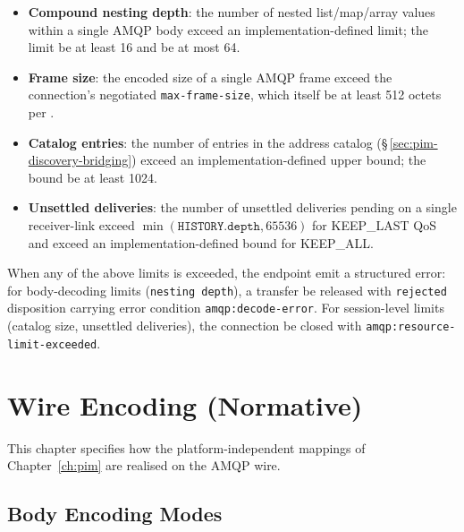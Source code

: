 \documentclass{../styles/zerodds-vendor-spec}
\begin{document}
\begin{itemize}
  \item \textbf{Compound nesting depth}: the number of nested
        list/map/array values within a single AMQP body
         exceed an implementation-defined limit;
        the limit  be at least 16 and 
        be at most 64.
  \item \textbf{Frame size}: the encoded size of a single AMQP
        frame  exceed the connection's negotiated
        \texttt{max-frame-size}, which itself  be at
        least 512 octets per
        .
  \item \textbf{Catalog entries}: the number of entries in
        the address catalog (\S\,\ref{sec:pim-discovery-bridging})
         exceed an implementation-defined upper
        bound; the bound  be at least 1024.
  \item \textbf{Unsettled deliveries}: the number of unsettled
        deliveries pending on a single receiver-link
         exceed
        $\min(\texttt{HISTORY.depth}, 65536)$ for KEEP\_LAST QoS
        and  exceed an implementation-defined
        bound for KEEP\_ALL.
\end{itemize}

When any of the above limits is exceeded, the endpoint
 emit a structured error: for body-decoding limits
(\texttt{nesting depth}), a transfer  be released
with \texttt{rejected} disposition carrying error condition
\texttt{amqp:decode-error}. For session-level limits (catalog
size, unsettled deliveries), the connection  be
closed with \texttt{amqp:resource-limit-exceeded}.

\chapter{Wire Encoding (Normative)}\label{ch:psm}

This chapter specifies how the platform-independent mappings of
Chapter~\ref{ch:pim} are realised on the AMQP wire.

\section{Body Encoding Modes}
\end{document}
